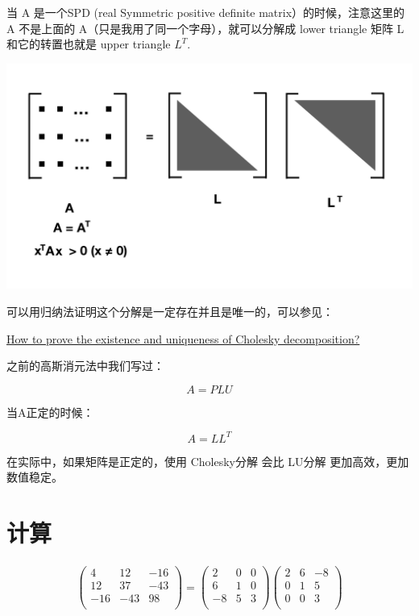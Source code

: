 \documentclass[
]{book}
\begin{document}
当 A 是一个SPD (real Symmetric positive definite matrix）的时候，注意这里的A 不是上面的 A（只是我用了同一个字母），就可以分解成 lower triangle 矩阵 L 和它的转置也就是 upper triangle \(L^T\).

\includegraphics{images/Cholesky_ALL.png}

可以用归纳法证明这个分解是一定存在并且是唯一的，可以参见：

\href{https://math.stackexchange.com/questions/2509810/how-to-prove-the-existence-and-uniqueness-of-cholesky-decomposition}{How to prove the existence and uniqueness of Cholesky decomposition?}

之前的高斯消元法中我们写过：

\[
A = PLU
\]

当A正定的时候：

\[
A = LL^T
\]

在实际中，如果矩阵是正定的，使用 Cholesky分解 会比 LU分解 更加高效，更加数值稳定。

\hypertarget{ux8ba1ux7b97-1}{%
\section{计算}\label{ux8ba1ux7b97-1}}

\[
\begin{aligned}
\left({\begin{array}{*{3}{r}}4&12&-16\\12&37&-43\\-16&-43&98\\\end{array}}\right)=\left({\begin{array}{*{3}{r}}2&0&0\\6&1&0\\-8&5&3\\\end{array}}\right)\left({\begin{array}{*{3}{r}}2&6&-8\\0&1&5\\0&0&3\\\end{array}}\right)
\end{aligned}
\]
\end{document}
